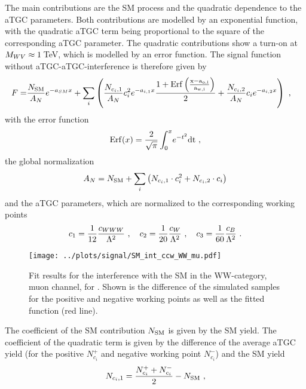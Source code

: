 The main contributions are the SM process and the quadratic dependence to the aTGC parameters. Both contributions are modelled by an exponential function, with the quadratic aTGC term being proportional to the square of the corresponding aTGC parameter. The quadratic contributions show a turn-on at $M_{WV} \approx 1$\,TeV, which is modelled by an error function. The signal function without aTGC-aTGC-interference is therefore given by
\begin{align}
F =& \frac{N_{\rm SM}}{A_N} e^{-a_{SM}x} + \sum_i \left( \frac{N_{c_i,1}}{A_N} c_i^2 e^{-a_{i,1} x} \frac{1+\rm{Erf}\left(\frac{x-a_{o,i}}{a_{w,i}}\right)}{2} + \frac{N_{c_i,2}}{A_N} c_i e^{-a_{i,2}x} \right)  ~,
\label{eq:signal:sigfunc}
\end{align}
with the error function
\begin{equation}
{\rm Erf}(x) = \frac{2}{\sqrt{\pi}}\int_0^x \! e^{-t^2}{\rm dt} ~,
\end{equation}
the global normalization
\begin{equation}
A_N = N_{\rm SM} + \sum_i \left( N_{c_i,1}\cdot c_i^2 + N_{c_i,2}\cdot c_i \right) 
\label{eq:signal:globnorm}
\end{equation} 
and the aTGC parameters, which are normalized to the corresponding working points
\begin{equation}
c_1 = \frac{1}{12}\frac{c_{WWW}}{\Lambda^2} ~ , \quad c_2 = \frac{1}{20}\frac{c_{W}}{\Lambda^2} ~ , \quad c_3 = \frac{1}{60}\frac{c_{B}}{\Lambda^2} ~.
\end{equation}
\begin{figure}
	\centering
		\texttt{[image: ../plots/signal/SM\_int\_ccw\_WW\_mu.pdf]}
	\caption[Fit results for the interference with the SM in the WW-category, muon channel]{Fit results for the interference with the SM in the WW-category, muon channel, for \Tccw . Shown is the difference of the simulated samples for the positive and negative working points as well as the fitted function (red line).}
	\label{fig:signal:sm_int_WW_mu}
\end{figure}
The coefficient of the SM contribution $N_{\rm SM}$ is given by the SM yield. The coefficient of the quadratic term is given by the difference of the average aTGC yield (for the positive $N_{c_i}^{+}$ and negative working point $N_{c_i}^{-}$) and the SM yield
\begin{equation}
N_{c_i,1} = \frac{N_{c_i}^{+}+N_{c_i}^{-}}{2}-N_{\rm SM} ~,
\label{eq:signal:n1}
\end{equation}
